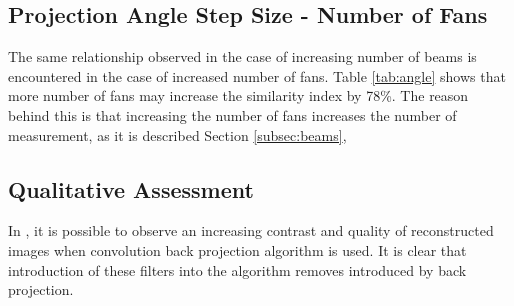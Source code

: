 \documentclass[journal]{IEEEtran}
\begin{document}
\subsection{Projection Angle Step Size - Number of Fans}
The same relationship observed in the case of increasing number of beams is encountered in the case of increased number of fans. Table \ref{tab:angle} shows that more number of fans may increase the similarity index by 78\%. The reason behind this is that increasing the number of fans increases the number of measurement, as it is described Section \ref{subsec:beams}, 

\subsection{Qualitative Assessment}
In , it is possible to observe an increasing contrast and quality of reconstructed images when convolution back projection algorithm is used. It is clear that introduction of these filters into the algorithm removes introduced by back projection. 
\newpage
\printbibliography
\end{document}
